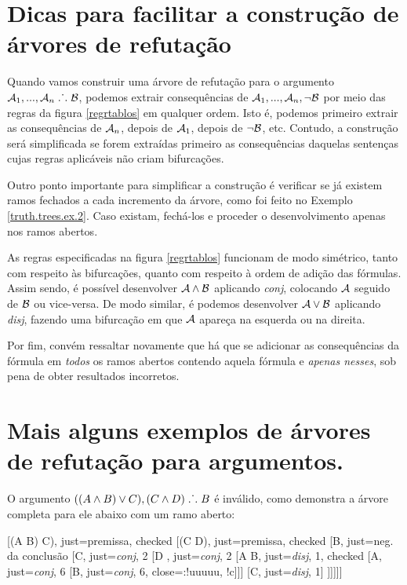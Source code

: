 \section{Dicas para facilitar a construção de árvores de refutação}

Quando vamos construir uma árvore de refutação para o argumento $\mathcal{A}_1,...,\mathcal{A}_n \mathrel{\ldotp\dot{}\,\ldotp} \mathcal{B}$, podemos extrair consequências de $\mathcal{A}_1,...,\mathcal{A}_n, \neg \mathcal{B}$ por meio das regras da figura \ref{regrtablos} em qualquer ordem.
Isto é, podemos primeiro extrair as consequências de $\mathcal{A}_n$, depois de $\mathcal{A}_1$, depois de $\neg \mathcal{B}$, etc.
Contudo, a construção será simplificada se forem extraídas primeiro as consequências daquelas sentenças cujas regras aplicáveis não criam bifurcações.

Outro ponto importante para simplificar a construção é verificar se já existem ramos fechados a cada incremento da árvore, como foi feito no Exemplo \ref{truth.trees.ex.2}.
Caso existam, fechá-los e proceder o desenvolvimento apenas nos ramos abertos.

As regras especificadas na figura \ref{regrtablos} funcionam de modo simétrico, tanto com respeito às bifurcações, quanto com respeito à ordem de adição das fórmulas.
Assim sendo, é possível desenvolver $\mathcal{A} \wedge \mathcal{B}$ aplicando \emph{conj}, colocando $\mathcal{A}$ seguido de $\mathcal{B}$ ou vice-versa.
De modo similar, é podemos desenvolver $\mathcal{A} \vee \mathcal{B}$ aplicando \emph{disj}, fazendo uma bifurcação em que $\mathcal{A}$ apareça na esquerda ou na direita.

Por fim, convém ressaltar novamente que há que se adicionar as consequências da fórmula em \emph{todos} os ramos abertos contendo aquela fórmula e \emph{apenas nesses}, sob pena de obter resultados incorretos.

\section{Mais alguns exemplos de árvores de refutação para argumentos.}

O argumento $((A \wedge B) \vee C), (C \land D) \mathrel{\ldotp\dot{}\,\ldotp} B$ é inválido, como demonstra a árvore completa para ele abaixo com um ramo aberto:

\begin{center}
\begin{tableau}
	{
}
	[(A \eand B) \eor C), just=premissa, checked
	[(C \land D), just=premissa, checked
	[\enot B, just={neg. da conclusão}
	[C, just={\emph{conj}, 2}
	[D	, just={\emph{conj}, 2}
		[A \eand B, just={\emph{disj}, 1}, checked
			[A, just={\emph{conj}, 6}
			[B, just={\emph{conj}, 6}, close={:!uuuuu, !c}]]]
		[C, just={\emph{disj}, 1}]
		]]]]]
\end{tableau}
\end{center}

